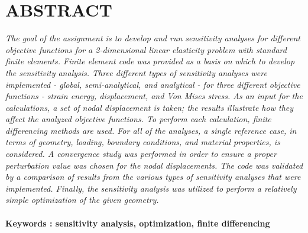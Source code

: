 \section*{\normalsize{ABSTRACT}}


\textit{The goal of the assignment is to develop and run sensitivity analyses for different objective functions for a 2-dimensional linear elasticity problem with standard finite elements. Finite element code was provided as a basis on which to develop the sensitivity analysis. Three different types of sensitivity analyses were implemented - global, semi-analytical, and analytical - for three different objective functions - strain energy, displacement, and Von Mises stress.  As an input for the calculations, a set of nodal displacement is taken; the results illustrate how they affect the analyzed objective functions. To perform each calculation, finite differencing methods are used. For all of the analyses, a single reference case, in terms of geometry, loading, boundary conditions, and material properties, is considered. A convergence study was performed in order to ensure a proper perturbation value was chosen for the nodal displacements. The code was validated by a comparison of results from the various types of sensitivity analyses that were implemented. Finally, the sensitivity analysis was utilized to perform a relatively simple optimization of the given geometry.}\\%

\paragraph*{Keywords : sensitivity analysis, optimization, finite differencing}